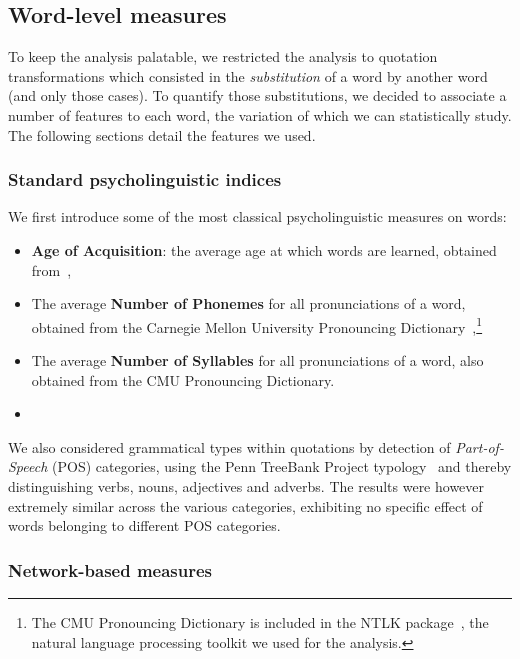 \subsection{Word-level measures}

To keep the analysis palatable, we restricted the analysis to quotation transformations which consisted in the \emph{substitution} of a word by another word (and only those cases).
To quantify those substitutions, we decided to associate a number of features to each word, the variation of which we can statistically study.
The following sections detail the features we used.

\subsubsection{Standard psycholinguistic indices}

We first introduce some of the most classical psycholinguistic measures on words:

\begin{itemize}
    \item \textbf{Age of Acquisition}: the average age at which words are learned, obtained from~\citet{kuperman12},
    \item The average \textbf{Number of Phonemes} for all pronunciations of a word, obtained from the Carnegie Mellon University Pronouncing Dictionary~\citep{Weide98},\footnote{The CMU Pronouncing Dictionary is included in the NTLK package~\citep{Bird09}, the natural language processing toolkit we used for the analysis.}
    \item The average \textbf{Number of Syllables} for all pronunciations of a word, also obtained from the CMU Pronouncing Dictionary.
    \item {}
\end{itemize}

We also considered grammatical types within quotations by detection of \emph{Part-of-Speech} (POS) categories, using the Penn TreeBank Project typology~\citep{Santorini90} and thereby distinguishing verbs, nouns, adjectives and adverbs.
The results were however extremely similar across the various categories, exhibiting no specific effect of words belonging to different POS categories.

\subsubsection{Network-based measures}

